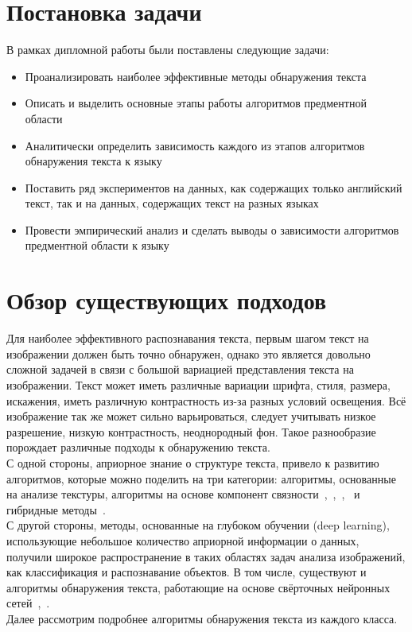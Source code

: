 \documentclass{matmex-diploma-custom}
\begin{document}
\section*{Постановка задачи}
В рамках дипломной работы были поставлены следующие задачи:
\begin{itemize}
\item Проанализировать наиболее эффективные методы обнаружения текста
\item Описать и выделить основные этапы работы алгоритмов предментной области
\item Аналитически определить зависимость каждого из этапов алгоритмов обнаружения текста к языку
\item Поставить ряд экспериментов на данных, как содержащих только английский текст, так и на данных, содержащих текст на разных языках
\item Провести эмпирический анализ и сделать выводы о зависимости алгоритмов предментной области к языку
\end{itemize}
\section{Обзор существующих подходов}
Для наиболее эффективного распознавания текста, первым шагом текст на изображении должен быть точно обнаружен, однако это является довольно сложной задачей в связи с большой вариацией представления текста на  изображении. Текст может иметь различные вариации шрифта, стиля, размера, искажения, иметь различную контрастность из-за разных условий освещения. Всё изображение так же может сильно варьироваться, следует учитывать низкое разрешение, низкую контрастность, неоднородный фон. Такое разнообразие порождает различные подходы к обнаружению текста.\\
\indent С одной стороны, априорное знание о структуре текста, привело к развитию алгоритмов, которые можно поделить на три категории: алгоритмы, основанные на анализе текстуры, алгоритмы на основе компонент связности~\cite{Yin01},~\cite{Gomez02},~\cite{Yalniz04},~\cite{Chen05} и гибридные методы~\cite{Barinova03}.\\
\indent С другой стороны, методы, основанные на глубоком обучении (deep learning), использующие небольшое количество априорной информации о данных, получили широкое распространение в таких областях задач анализа изображений, как классификация и распознавание объектов. В том числе, существуют и  алгоритмы обнаружения текста, работающие на основе свёрточных нейронных сетей~\cite{wang},~\cite{coates}.\\
\indent Далее рассмотрим подробнее алгоритмы обнаружения текста из каждого класса.  
\end{document}
